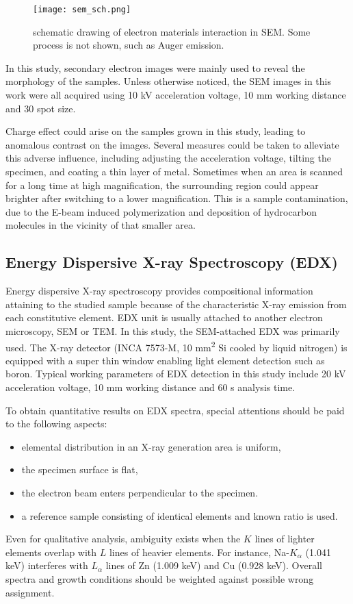 \begin{figure}[htb]
\centering
\texttt{[image: sem\_sch.png]}
\caption[SEM excitation volume]{schematic drawing of electron materials interaction in SEM. Some process is not shown, such as Auger emission.}
\label{fig:ch2sem}
\end{figure}

In this study, secondary electron images were mainly used to reveal the morphology of the samples. Unless otherwise noticed, the SEM images in this work were all acquired using 10 kV acceleration voltage, 10 mm working distance and 30 spot size.

Charge effect could arise on the samples grown in this study, leading to anomalous contrast on the images. Several measures could be taken to alleviate this adverse influence, including adjusting the acceleration voltage, tilting the specimen, and coating a thin layer of metal. Sometimes when an area is scanned for a long time at high magnification, the surrounding region could appear brighter after switching to a lower magnification. This is a sample contamination, due to the E-beam induced polymerization and deposition of hydrocarbon molecules in the vicinity of that smaller area. 


\subsection{Energy Dispersive X-ray Spectroscopy (EDX)}\label{sec:edx}

Energy dispersive X-ray spectroscopy provides compositional information attaining to the studied sample because of the characteristic X-ray emission from each constitutive element. EDX unit is usually attached to another electron microscopy, SEM or TEM. In this study, the SEM-attached EDX was primarily used. The X-ray detector (INCA 7573-M, 10 \si{mm^2} Si cooled by liquid nitrogen) is equipped with a super thin window enabling light element detection such as boron. Typical working parameters of EDX detection in this study include 20 kV acceleration voltage, 10 mm working distance and 60 s analysis time.

To obtain quantitative results on EDX spectra, special attentions should be paid to the following aspects:
\begin{itemize}
\item elemental distribution in an X-ray generation area is uniform,
\item the specimen surface is flat,
\item the electron beam enters perpendicular to the specimen. 
\item a reference sample consisting of identical elements and known ratio is used. 
\end{itemize}
Even for qualitative analysis, ambiguity exists when the $K$ lines of lighter elements overlap with $L$ lines of heavier elements. For instance, Na-$K_\alpha$ (1.041 keV) interferes with $L_\alpha$ lines of Zn (1.009 keV) and Cu (0.928 keV). Overall spectra and growth conditions should be weighted against possible wrong assignment. 


